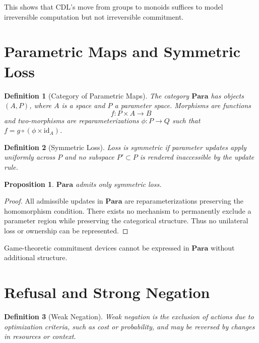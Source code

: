 \documentclass[11pt]{article}
\newtheorem{definition}{Definition}
\newtheorem{proposition}{Proposition}
\begin{document}
This shows that CDL’s move from groups to monoids suffices to model irreversible
computation but not irreversible commitment.

\section{Parametric Maps and Symmetric Loss}

\begin{definition}[Category of Parametric Maps]
The category $\mathbf{Para}$ has objects $(A,P)$, where $A$ is a space and $P$ a
parameter space. Morphisms are functions
\[
f : P \times A \to B
\]
and two-morphisms are reparameterizations $\phi : P \to Q$ such that
$f = g \circ (\phi \times \mathrm{id}_A)$.
\end{definition}

\begin{definition}[Symmetric Loss]
Loss is \emph{symmetric} if parameter updates apply uniformly across $P$ and no
subspace $P' \subset P$ is rendered inaccessible by the update rule.
\end{definition}

\begin{proposition}
$\mathbf{Para}$ admits only symmetric loss.
\end{proposition}

\begin{proof}
All admissible updates in $\mathbf{Para}$ are reparameterizations preserving the
homomorphism condition. There exists no mechanism to permanently exclude a
parameter region while preserving the categorical structure. Thus no unilateral
loss or ownership can be represented.
\end{proof}

\begin{corollary}
Game-theoretic commitment devices cannot be expressed in $\mathbf{Para}$ without
additional structure.
\end{corollary}

\section{Refusal and Strong Negation}

\begin{definition}[Weak Negation]
Weak negation is the exclusion of actions due to optimization criteria, such as
cost or probability, and may be reversed by changes in resources or context.
\end{definition}
\end{document}
